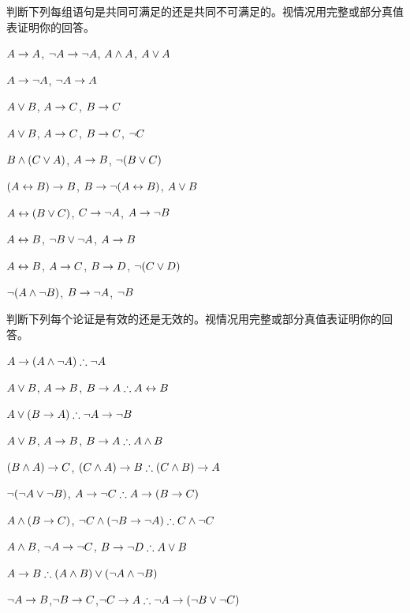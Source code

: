 \noindent\problempart
\label{pr.TT.satisfiable5}
判断下列每组语句是共同可满足的还是共同不可满足的。视情况用完整或部分真值表证明你的回答。

\begin{compactlist}
\item $A\rightarrow A$, $\neg A \rightarrow \neg A$, $A\wedge A$, $A\vee A$ %
\item $A \rightarrow \neg A$, $\neg A \rightarrow A$%
\item $A\vee B$, $A\rightarrow C$, $B\rightarrow C$ %
\item $A \vee B$, $A \rightarrow C$, $B \rightarrow C$, $\neg C$ %
\item $B\wedge(C\vee A)$, $A\rightarrow B$, $\neg(B\vee C)$  %
\item $(A \leftrightarrow B) \rightarrow B$,  $B \rightarrow \neg (A \leftrightarrow B)$, $A \vee B$  %
\item $A\leftrightarrow(B\vee C)$, $C\rightarrow \neg A$, $A\rightarrow \neg B$ %
\item  $A \leftrightarrow B$,  $\neg B \vee \neg A$,  $A \rightarrow  B$ %
\item $A \leftrightarrow B$, $A \rightarrow C$, $B \rightarrow D$, $\neg(C \vee D)$ %
\item $\neg (A \wedge \neg B)$,  $B \rightarrow \neg A$, $\neg B$   %
\end{compactlist}

\noindent\problempart
判断下列每个论证是有效的还是无效的。视情况用完整或部分真值表证明你的回答。
\label{pr.TT.valid5}

\begin{compactlist}
\item $A\eif(A\eand\enot A)\therefore \enot A$%
\item $A \vee B$, $A \rightarrow B$, $B \eif A \therefore  A \eiff B$  %
\item $A\eor(B\eif A)\therefore \enot A \eif \enot B$ %
\item $A \vee B$, $A \rightarrow B$, $ B \eif A \therefore  A \eand B$ %
\item $(B\wedge A)\rightarrow C$, $(C\eand A)\eif B\therefore (C\eand B)\eif A$ %
\item $\neg (\neg A \vee \neg B)$, $A \eif \enot C \therefore  A \eif (B \eif C)$ %
\item $A \wedge (B \rightarrow C)$, $\enot C \eand (\enot B \eif \enot A)\therefore C \eand \enot C$ %
\item $A \wedge B$, $\neg A \rightarrow \neg C$, $B \eif \enot D \therefore  A \eor B$ %
\item $A \eif B\therefore (A \eand B) \eor (\enot A \eand \enot B)$ %
\item $\neg A \rightarrow B$,$ \neg B \rightarrow C $,$ \enot C \eif A \therefore  \enot A \eif (\enot B \eor \enot C) $%

\end{compactlist}

